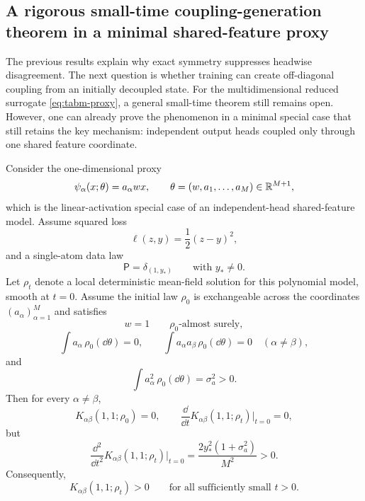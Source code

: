 \subsection{A rigorous small-time coupling-generation theorem in a minimal shared-feature proxy}

The previous results explain why exact symmetry suppresses headwise disagreement.
The next question is whether training can create off-diagonal coupling from an initially decoupled state.
For the multidimensional reduced surrogate \eqref{eq:tabm-proxy}, a general small-time theorem still remains open.
However, one can already prove the phenomenon in a minimal special case that still retains the key mechanism:
independent output heads coupled only through one shared feature coordinate.

\begin{proposition}
\label{prop:small-time-generation}
Consider the one-dimensional proxy
\begin{equation}
  \psi_\alpha(x;\theta)=a_\alpha w x,
  \qquad
  \theta=(w,a_1,\dots,a_M)\in \mathbb{R}^{M+1},
  \label{eq:minimal-proxy}
\end{equation}
which is the linear-activation special case of an independent-head shared-feature model.
Assume squared loss
\[
  \ell(z,y)=\frac12 (z-y)^2,
\]
and a single-atom data law
\[
  \mathsf P=\delta_{(1,y_*)}
  \qquad
  \text{with } y_*\neq 0.
\]
Let $\rho_t$ denote a local deterministic mean-field solution for this polynomial model, smooth at $t=0$.
Assume the initial law $\rho_0$ is exchangeable across the coordinates $(a_\alpha)_{\alpha=1}^M$ and satisfies
\[
  w=1
  \qquad
  \rho_0\text{-almost surely},
\]
\[
  \int a_\alpha\,\rho_0(\dd \theta)=0,
  \qquad
  \int a_\alpha a_\beta\,\rho_0(\dd \theta)=0
  \quad
  (\alpha\neq\beta),
\]
and
\[
  \int a_\alpha^2\,\rho_0(\dd \theta)=\sigma_a^2>0.
\]
Then for every $\alpha\neq\beta$,
\begin{equation}
  K_{\alpha\beta}(1,1;\rho_0)=0,
  \qquad
  \frac{\dd}{\dd t}K_{\alpha\beta}(1,1;\rho_t)\Big|_{t=0}=0,
  \label{eq:small-time-zero}
\end{equation}
but
\begin{equation}
  \frac{\dd^2}{\dd t^2}K_{\alpha\beta}(1,1;\rho_t)\Big|_{t=0}
  =
  \frac{2y_*^2(1+\sigma_a^2)}{M^2}
  >0.
  \label{eq:small-time-positive}
\end{equation}
Consequently,
\[
  K_{\alpha\beta}(1,1;\rho_t)>0
  \qquad
  \text{for all sufficiently small } t>0.
\]
\end{proposition}

